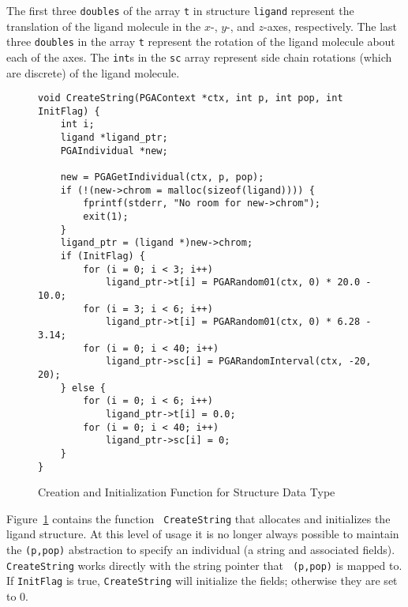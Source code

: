\documentclass{report}
\begin{document}
The first three {\tt doubles} of the array {\tt t} in structure {\tt ligand}
represent the translation of the ligand molecule in the $x$-, $y$-, and
$z$-axes, respectively.  The last three {\tt doubles} in the array {\tt t}
represent the rotation of the ligand molecule about each of the axes.  The
{\tt int}s in the {\tt sc} array represent side chain rotations (which are
discrete) of the ligand molecule.



\begin{figure}
\begin{verbatim}
void CreateString(PGAContext *ctx, int p, int pop, int InitFlag) {
    int i;
    ligand *ligand_ptr;
    PGAIndividual *new;

    new = PGAGetIndividual(ctx, p, pop);
    if (!(new->chrom = malloc(sizeof(ligand)))) {
        fprintf(stderr, "No room for new->chrom");
        exit(1);
    }
    ligand_ptr = (ligand *)new->chrom;
    if (InitFlag) {
        for (i = 0; i < 3; i++)
            ligand_ptr->t[i] = PGARandom01(ctx, 0) * 20.0 - 10.0;
        for (i = 3; i < 6; i++)
            ligand_ptr->t[i] = PGARandom01(ctx, 0) * 6.28 - 3.14;
        for (i = 0; i < 40; i++)
            ligand_ptr->sc[i] = PGARandomInterval(ctx, -20, 20);
    } else {
        for (i = 0; i < 6; i++)
            ligand_ptr->t[i] = 0.0;
        for (i = 0; i < 40; i++)
            ligand_ptr->sc[i] = 0;
    }
}
\end{verbatim}
\caption{Creation and Initialization Function for Structure Data Type}
\label{example1:new-datatype-create}
\end{figure}


Figure~\ref{example1:new-datatype-create} contains the function {\tt
CreateString} that allocates and initializes the ligand structure.  At this
level of usage it is no longer always possible to maintain the {\tt (p,pop)}
abstraction to specify an individual (a string and associated fields).  {\tt
CreateString} works directly with the string pointer that {\tt
(p,pop)} is mapped to.  If {\tt InitFlag} is true, {\tt CreateString} will
initialize the fields; otherwise they are set to 0.
\end{document}
